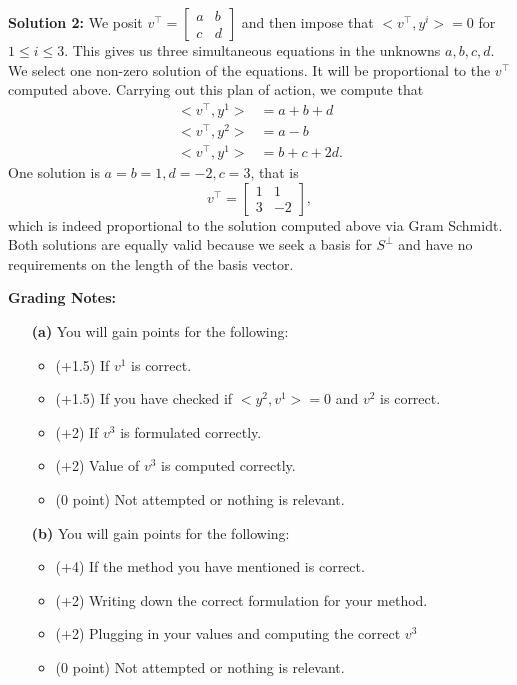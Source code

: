 \documentclass[letterpaper]{article}
\begin{document}
\begin{enumerate}
\textbf{Solution 2:} We posit $v^\top =  \begin{bmatrix}a & b \\ c & d \end{bmatrix}$ and then impose that $<v^\top, y^i>=0$ for $1 \le i \le 3$. This gives us three simultaneous equations in the unknowns $a, b, c, d$. We select one non-zero solution of the equations. It will be proportional to the $v^\top$ computed above. Carrying out this plan of action, we compute that
\begin{align*}
<v^\top, y^1>&=a + b +d \\
<v^\top, y^2>&=a -b \\
<v^\top, y^1>&=b+c+2d.
\end{align*}
One solution is $a=b=1, d=-2, c=3$, that is
 $$v^\top =  \begin{bmatrix}1 & 1 \\ 3 & -2 \end{bmatrix},$$
 which is indeed proportional to the solution computed above via Gram Schmidt. Both solutions are equally valid because we seek a basis for $S^\perp$ and have no requirements on the length of the basis vector.

\end{enumerate}

\noindent \textbf{Grading Notes:}
\begin{enumerate}
  \item[\bf (a)] You will gain points for the following:
    \begin{itemize}
      \item (+1.5) If $v^1$ is correct.
      \item (+1.5) If you have checked if $<y^2, v^1>= 0$ and $v^2$ is correct.
      \item (+2) If $v^3$ is formulated correctly.
      \item (+2) Value of $v^3$ is computed correctly.
      \item (0 point) Not attempted or nothing is relevant.
    \end{itemize}
  \item[\bf (b)] You will gain points for the following:
    \begin{itemize}
      \item (+4) If the method you have mentioned is correct.
      \item (+2) Writing down the correct formulation for your method.
      \item (+2) Plugging in your values and computing the correct $v^3$
      \item (0 point) Not attempted or nothing is relevant.
    \end{itemize}
\end{enumerate}
\end{document}
